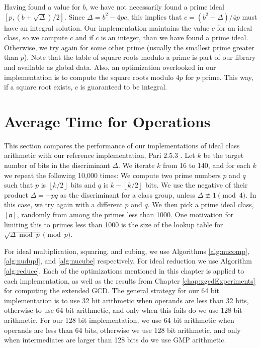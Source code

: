 \documentclass{ucalgthes1}
\theoremstyle{definition}
\newcommand{\floor}[1]{\left\lfloor #1 \right\rfloor}
\newcommand{\Pari}{Pari 2.5.3}
\begin{document}
Having found a value for $b$, we have not necessarily found a prime ideal $[p, (b + \sqrt\Delta)/2]$.  Since $\Delta = b^2 - 4pc$, this implies that $c = (b^2 - \Delta)/4p$ must have an integral solution.  Our implementation maintains the value $c$ for an ideal class, so we compute $c$ and if $c$ is an integer, than we have found a prime ideal.  Otherwise, we try again for some other prime (usually the smallest prime greater than $p$).  Note that the table of square roots modulo a prime is part of our library and available as global data.  Also, an optimization overlooked in our implementation is to compute the square roots modulo $4p$ for $p$ prime.  This way, if a square root exists, $c$ is guaranteed to be integral.


\section{Average Time for Operations}
\label{sec:idealResults}

This section compares the performance of our implementations of ideal class arithmetic with our reference implementation, \Pari{} \cite{PariGP}.   Let $k$ be the target number of bits in the discriminant $\Delta$.  We iterate $k$ from 16 to 140, and for each $k$ we repeat the following 10,000 times: We compute two prime numbers $p$ and $q$ such that $p$ is $\floor{k/2}$ bits and $q$ is $k-\floor{k/2}$ bits.  We use the negative of their product $\Delta = -pq$ as the discriminant for a class group, unless $\Delta \not\equiv 1 \pmod 4$.  In this case, we try again with a different $p$ and $q$.  We then pick a prime ideal class, $[\mathfrak a]$, randomly from among the primes less than 1000.  One motivation for limiting this to primes less than 1000 is the size of the lookup table for $\sqrt{\Delta \bmod p} \pmod p$.

For ideal multiplication, squaring, and cubing, we use Algorithms \ref{alg:nucomp}, \ref{alg:nudupl}, and \ref{alg:nucube} respectively.  For ideal reduction we use Algorithm \ref{alg:reduce}.  Each of the optimizations mentioned in this chapter is applied to each implementation, as well as the results from Chapter \ref{chap:xgcdExperiments} for computing the extended GCD.   The general strategy for our 64 bit implementation is to use 32 bit arithmetic when operands are less than 32 bits, otherwise to use 64 bit arithmetic, and only when this fails do we use 128 bit arithmetic.  For our 128 bit implementation, we use 64 bit arithmetic when operands are less than 64 bits, otherwise we use 128 bit arithmetic, and only when intermediates are larger than 128 bits do we use GMP arithmetic.
\end{document}
